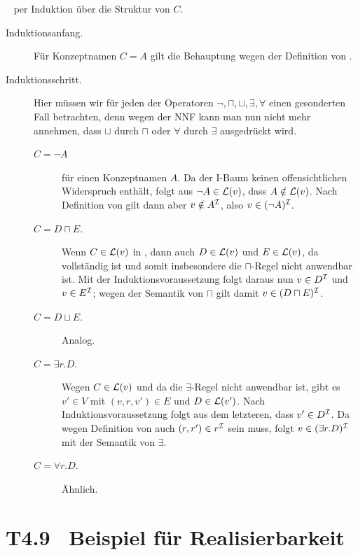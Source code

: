 \documentclass[fontsize=11pt, twoside=false, numbers=autoenddot]{scrbook}
\begin{document}
\par\medskip
{}~
per Induktion über die Struktur von $C$.
%
\begin{description}
  \item[Induktionsanfang.]
    Für Konzeptnamen $C=A$ gilt die Behauptung wegen der Definition von \Imc.
  \item[Induktionsschritt.]
    Hier müssen wir für jeden der Operatoren $\lnot,\sqcap,\sqcup,\exists,\forall$
    einen gesonderten Fall betrachten, denn wegen der NNF kann man nun
    nicht mehr annehmen, dass $\sqcup$ durch $\sqcap$ oder $\forall$ durch $\exists$
    ausgedrückt wird.
    \begin{description}
      \item[{\boldmath $C = \lnot A$}]
        für einen Konzeptnamen $A$.
        Da der I-Baum \Bmc keinen offensichtlichen Widerspruch enthält,
        folgt aus $\lnot A \in \mathcal{L}(v)$,
        dass $A \notin \mathcal{L}(v)$.
        Nach Definition von \Imc gilt dann aber $v \notin A^\mathcal{I}$,
        also $v \in (\lnot A)^\mathcal{I}$.
      \item[{\boldmath $C = D \sqcap E$.}]
        Wenn $C \in \mathcal{L}(v)$ in \Bmc,
        dann auch $D \in \mathcal{L}(v)$
        und $E \in \mathcal{L}(v)$,
        da \Bmc vollständig ist und somit insbesondere die
        $\sqcap$-Regel nicht anwendbar ist.
        Mit der Induktionsvoraussetzung folgt daraus nun $v \in D^\mathcal{I}$ und $v \in E^\mathcal{I}$;
        wegen der Semantik von $\sqcap$ gilt damit $v \in (D \sqcap E)^\mathcal{I}$.
      \item[{\boldmath $C = D \sqcup E$.}]
        Analog.
      \item[{\boldmath $C = \exists r.D$.}]
        Wegen $C \in \mathcal{L}(v)$
        und da die $\exists$-Regel nicht anwendbar ist,
        gibt es $v' \in V$ mit $(v,r,v') \in E$ und $D \in \mathcal{L}(v')$.
        Nach Induktionsvoraussetzung folgt aus dem letzteren,
        dass $v' \in D^\mathcal{I}$.
        Da wegen Definition von \Imc auch $(r,r') \in r^\mathcal{I}$ sein muss,
        folgt $v \in (\exists r.D)^\mathcal{I}$ mit der Semantik von $\exists$.
      \item[{\boldmath $C = \forall r.D$.}]
        Ähnlich.
        \qedhere
    \end{description}
\end{description}

\goodbreak

\section*{T4.9~ Beispiel für Realisierbarkeit}
\end{document}
